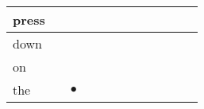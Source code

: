 \documentclass[landscape]{article}
\newcommand{\ssp}{\hspace{2pt}}
\newcommand{\mex}{\cellcolor{g}$\bullet$}
\begin{document}
\begin{tabular}{|l|p{10pt}|p{10pt}|p{10pt}|p{10pt}|p{10pt}|p{10pt}|p{10pt}|p{10pt}|p{10pt}|p{10pt}|p{10pt}|}
\hline
\ssp press \ssp&\hspace{2pt}&\hspace{2pt}&\hspace{2pt}&\hspace{2pt}&\hspace{2pt}&\hspace{2pt}&\hspace{2pt}&\hspace{2pt}&\hspace{2pt}&\hspace{2pt}&\hspace{2pt}\\
\hline
\ssp down \ssp&\hspace{2pt}&\hspace{2pt}&\hspace{2pt}&\hspace{2pt}&\hspace{2pt}&\hspace{2pt}&\hspace{2pt}&\hspace{2pt}&\hspace{2pt}&\hspace{2pt}&\hspace{2pt}\\
\hline
\ssp on \ssp&\hspace{2pt}&\hspace{2pt}&\hspace{2pt}&\hspace{2pt}&\hspace{2pt}&\hspace{2pt}&\hspace{2pt}&\hspace{2pt}&\hspace{2pt}&\hspace{2pt}&\hspace{2pt}\\
\hline
\ssp \cellcolor{ref1}the \ssp&\hspace{2pt}&\hspace{2pt}\mex&\hspace{2pt}&\hspace{2pt}&\hspace{2pt}&\hspace{2pt}&\hspace{2pt}&\hspace{2pt}&\hspace{2pt}&\hspace{2pt}&\hspace{2pt}\\

\end{tabular}
\end{document}

